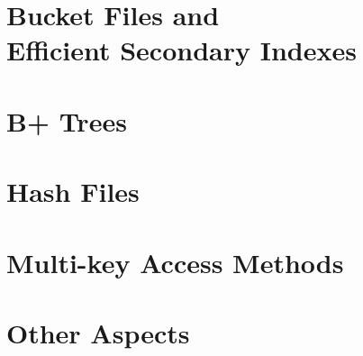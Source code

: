 \documentclass[xcolor={usenames,dvipsnames}
    ,handout
]{beamer}
\begin{document}
\section{Bucket Files and\\ Efficient Secondary Indexes}



\section{B+ Trees}


\section{Hash Files}


\section{Multi-key Access Methods}


\section{Other Aspects}

\end{document}
